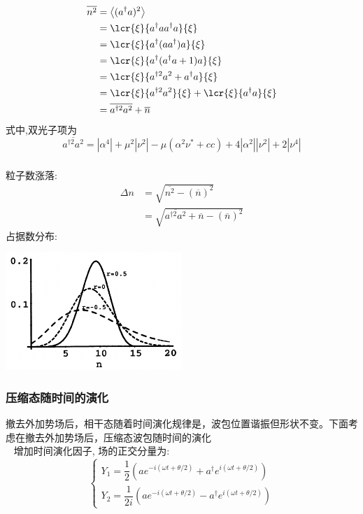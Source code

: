    \begin{frame}
    \frametitle{}
    \[ \begin{aligned}
        \overline{n^2} & = \left\langle (a^{\dagger} a)^2\right\rangle  \\ 
        &= \lcr{\xi} {a^{\dagger} a a^{\dagger} a} {\xi} \\ 
        &= \lcr{\xi} {a^{\dagger} (a a^{\dagger}) a} {\xi} \\ 
        &= \lcr{\xi} {a^{\dagger} (a^{\dagger} a +1) a} {\xi} \\ 
        &= \lcr{\xi} {a^{\dagger 2 }  a ^2 + a^{\dagger }a} {\xi} \\ 
        &= \lcr{\xi} {a^{\dagger 2 }  a ^2 } {\xi} +  \lcr{\xi} { a^{\dagger} a} {\xi} \\ 
        &= \overline{a^{\dagger 2 }  a ^2 } + \overline{n}
       \end{aligned}\] 
       式中,双光子项为 
       \[  \overline{a^{\dagger 2 }  a ^2 } = \left| \alpha ^4 \right| + \mu ^2 \left|\nu^2\right| - \mu (\alpha^2 \nu^* +cc) + 4 \left|\alpha^2 \right| \left|\nu^2\right| + 2 \left|\nu ^4\right|\] 
   \end{frame}

   \begin{frame}
    \frametitle{}
        粒子数涨落: 
    \[\begin{aligned}
             \Delta n & =\sqrt{ \overline{n^2} - (\overline{n})^2 } \\ 
             &= \sqrt{ \overline{a^{\dagger 2 }  a ^2 } + \overline{n} - (\overline{n})^2 }
    \end{aligned} \]
        占据数分布: 
      \begin{center}
           \includegraphics[width=0.5\textwidth]{figs/2022-05-03-23-54-35.png}
      \end{center}

   \end{frame}

   \begin{frame}
    \frametitle{压缩态随时间的演化}
    撤去外加势场后，相干态随着时间演化规律是，波包位置谐振但形状不变。下面考虑在撤去外加势场后，压缩态波包随时间的演化 \\   
    \例 [7.  求压缩态随时间的演化规律]{
    }
    \解~ 增加时间演化因子, 场的正交分量为: 
    $$\left\{\begin{matrix}
        Y_1=\dfrac{1}{2}(a e^{-i (\omega t + \theta /2) }+a^\dagger e^{i (\omega t + \theta /2) })\\ 
        Y_2=\dfrac{1}{2i}(a e^{-i (\omega t + \theta /2) }-a^\dagger e^{i (\omega t + \theta /2) })
    \end{matrix}\right.$$
   \end{frame}

